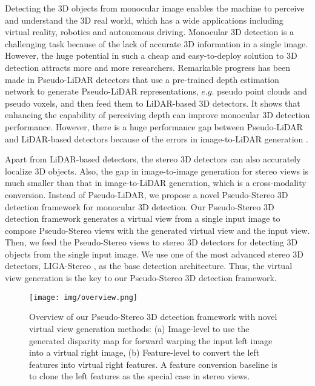 \documentclass[10pt,twocolumn,letterpaper]{article}
\begin{document}
Detecting the 3D objects from monocular image enables the machine to perceive and understand the 3D real world, which has a wide applications including virtual reality, robotics and autonomous driving. Monocular 3D detection is a challenging task because of the lack of accurate 3D information in a single image. However, the huge potential in such a cheap and easy-to-deploy solution to 3D detection attracts more and more researchers. 
Remarkable progress has been made in Pseudo-LiDAR detectors \cite{Ma_2020_ECCV,you2020pseudo,Liang_corr,simonelli2021we,chu2021neighbor} that use a pre-trained depth estimation network to generate Pseudo-LiDAR representations, $e.g.$ pseudo point clouds and pseudo voxels, and then feed them to LiDAR-based 3D detectors. It shows that enhancing the capability of perceiving depth can improve monocular 3D detection performance. However, there is a huge performance gap between Pseudo-LiDAR and LiDAR-based detectors because of the errors in image-to-LiDAR generation \cite{dd3d}.  

Apart from LiDAR-based detectors, the stereo 3D detectors \cite{guo2021liga,chen2020dsgn} can also accurately localize 3D objects. Also, the gap in image-to-image generation for stereo views is much smaller than that in image-to-LiDAR generation, which is a cross-modality conversion. Instead of Pseudo-LiDAR, we propose a novel Pseudo-Stereo 3D detection framework for monocular 3D detection. Our Pseudo-Stereo 3D detection framework generates a virtual view from a single input image to compose Pseudo-Stereo views with the generated virtual view and the input view. Then, we feed the Pseudo-Stereo views to stereo 3D detectors for detecting 3D objects from the single input image. We use one of the most advanced stereo 3D detectors, LIGA-Stereo \cite{guo2021liga}, as the base detection architecture. Thus, the virtual view generation is the key to our Pseudo-Stereo 3D detection framework.



\begin{figure}[t!]
  \centering
 \texttt{[image: img/overview.png]}
\vspace{-5mm}
  \caption{Overview of our Pseudo-Stereo 3D detection framework with novel virtual view generation methods: (a) Image-level to use the generated disparity map for forward warping the input left image into a virtual right image, (b) Feature-level to convert the left features into virtual right features. A feature conversion baseline is to clone the left features as the special case in stereo views.
} 
 \label{fig:virtual}
\vspace{-5mm}
\end{figure} 
\end{document}

